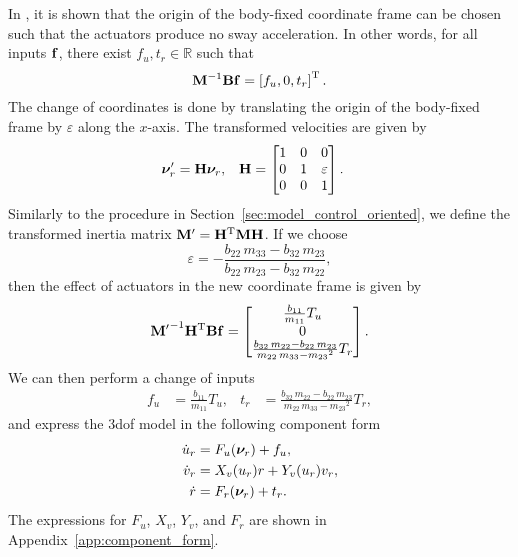 In \cite{fredriksen_global_2006}, it is shown that the origin of the body-fixed coordinate frame can be chosen such that the actuators produce no sway acceleration.
In other words, for all inputs $\mathbf{f}$, there exist $f_u, t_r \in \mathbb{R}$ such that
\begin{equation}
    \mathbf{M}^{-1}\mathbf{B}\mathbf{f} = \left[f_u, 0, t_r\right]^{\mathrm{T}}.
\end{equation}
The change of coordinates is done by translating the origin of the body-fixed frame by $\varepsilon$ along the $x$-axis.
The transformed velocities are given by
\begin{align}
    \bm{\nu}_r^{\prime} &= \mathbf{H}\bm{\nu}_r, &
    \mathbf{H} &= 
    \begin{bmatrix}
        1 & 0 & 0 \\ 0 & 1 & \varepsilon \\ 0 & 0 & 1
    \end{bmatrix}.
\end{align}
Similarly to the procedure in Section~\ref{sec:model_control_oriented}, we define the transformed inertia matrix $\mathbf{M}^{\prime} = \mathbf{H}^{\mathrm{T}}\mathbf{M}\mathbf{H}$.
If we choose
\begin{equation}
    \varepsilon = -\frac{b_{22}\,m_{33}-b_{32}\,m_{23}}{b_{22}\,m_{23}-b_{32}\,m_{22}},
\end{equation}
then the effect of actuators in the new coordinate frame is given by
\begin{equation}
    {\mathbf{M}^{\prime}}^{-1}\mathbf{H}^{\mathrm{T}}\mathbf{B}\mathbf{f}
    =
    \begin{bmatrix} \frac{b_{11}}{m_{11}} T_{u} \\ 0 \\ \frac{b_{32}\,m_{22}-b_{22}\,m_{23}}{m_{22}\,m_{33}-{m_{23}}^2} T_{r} \end{bmatrix}.
\end{equation}
We can then perform a change of inputs
\begin{align}
    f_u &= \frac{b_{11}}{m_{11}} T_{u}, &
    t_r &= \frac{b_{32}\,m_{22}-b_{22}\,m_{23}}{m_{22}\,m_{33}-{m_{23}}^2} T_{r},
\end{align}
and express the 3\gls{dof} model in the following component form
\begin{subequations}
    \begin{align}
        \dot{u}_r &= F_u(\bm{\nu}_r) + f_u, \\
        \dot{v}_r &= X_v(u_r)r + Y_v(u_r)v_r, \\
        \dot{r} &= F_r(\bm{\nu}_r) + t_r.
    \end{align}
    \label{eq:background_component_form_3DOF}
\end{subequations}
The expressions for $F_u$, $X_v$, $Y_v$, and $F_r$ are shown in Appendix~\ref{app:component_form}.

